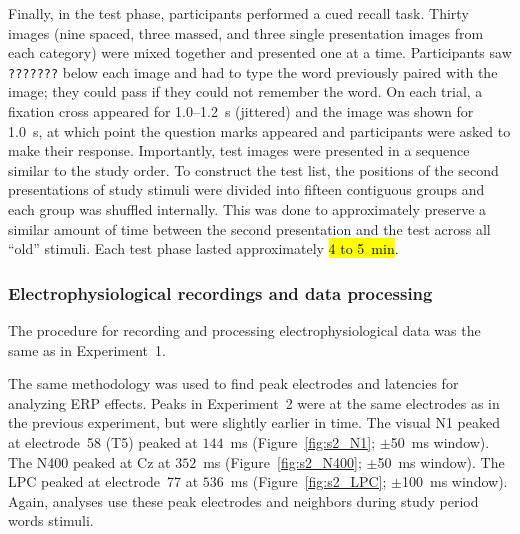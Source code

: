
Finally, in the test phase, participants performed a cued recall task.  Thirty images (nine spaced, three massed, and three single presentation images from each category) were mixed together and presented one at a time.  Participants saw \texttt{???????} below each image and had to type the word previously paired with the image; they could pass if they could not remember the word.  On each trial, a fixation cross appeared for 1.0--1.2~s (jittered) and the image was shown for 1.0~s, at which point the question marks appeared and participants were asked to make their response.  Importantly, test images were presented in a sequence similar to the study order.  To construct the test list, the positions of the second presentations of study stimuli were divided into fifteen contiguous groups and each group was shuffled internally.  This was done to approximately preserve a similar amount of time between the second presentation and the test across all ``old'' stimuli.  Each test phase lasted approximately \hl{4 to 5~min}.



\subsubsection{Electrophysiological recordings and data processing}

The procedure for recording and processing electrophysiological data was the same as in Experiment~1.

The same methodology was used to find peak electrodes and latencies for analyzing ERP effects.  Peaks in Experiment~2 were at the same electrodes as in the previous experiment, but were slightly earlier in time.
The visual N1 peaked at electrode~58 (T5) peaked at $144$~ms (Figure~\ref{fig:s2_N1}; $\pm$50~ms window).  The N400 peaked at Cz at $352$~ms (Figure~\ref{fig:s2_N400}; $\pm$50~ms window).  The LPC peaked at electrode~77 at $536$~ms (Figure~\ref{fig:s2_LPC}; $\pm$100~ms window).  Again, analyses use these peak electrodes and neighbors during study period words stimuli.

